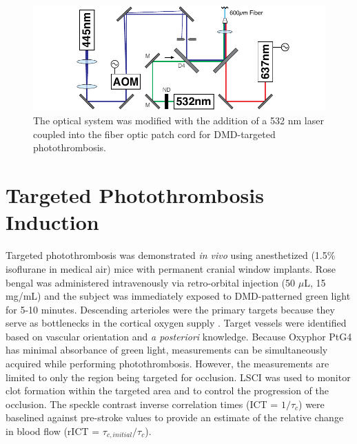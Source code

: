 \begin{figure}
    \includegraphics{figures/chapter_3/systemschematic_2.pdf}
    \caption{
        \label{fig:systemschematic_2}
        The optical system was modified with the addition of a 532 nm laser coupled into the fiber optic patch cord for DMD-targeted photothrombosis.
    }
\end{figure}



\section{Targeted Photothrombosis Induction}

Targeted photothrombosis was demonstrated \textit{in vivo} using anesthetized (1.5\% isoflurane in medical air) mice with permanent cranial window implants. Rose bengal was administered intravenously via retro-orbital injection (50 $\mu$L, 15 mg/mL) and the subject was immediately exposed to DMD-patterned green light for 5-10 minutes. Descending arterioles were the primary targets because they serve as bottlenecks in the cortical oxygen supply \cite{Nishimura:2007hk}. Target vessels were identified based on vascular orientation and \textit{a posteriori} knowledge. Because Oxyphor PtG4 has minimal absorbance of green light,  measurements can be simultaneously acquired while performing photothrombosis. However, the measurements are limited to only the region being targeted for occlusion. LSCI was used to monitor clot formation within the targeted area and to control the progression of the occlusion. The speckle contrast inverse correlation times (ICT = $1/\tau_c$) were baselined against pre-stroke values to provide an estimate of the relative change in blood flow (rICT = $\tau_{c,initial}/\tau_c$).

